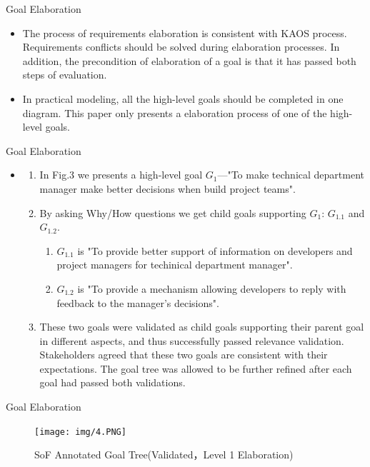 ﻿\documentclass{beamer}
\begin{document}
\begin{frame} {Goal Elaboration}    %
  \small{
    \begin{itemize}
    \item
      The process of requirements elaboration is consistent with KAOS process. Requirements conflicts should be solved during elaboration processes. In addition, the precondition of elaboration of a goal is that it has passed both steps of evaluation. \pause
    \item
      In practical modeling, all the high-level goals should be completed in one diagram. This paper only presents a elaboration process of one of the high-level goals.\pause
    \end{itemize}
  }
\end{frame}
\begin{frame}  {Goal Elaboration}
  \footnotesize{
    \begin{itemize}
    \item
      \begin{enumerate}
      \item  In Fig.3 we presents a high-level goal $G_1$—"To make technical department manager make better decisions when build project teams".
      \item  By asking Why/How questions we get child goals supporting $G_1$: $G_{1.1}$ and $G_{1.2}$.
        \begin{enumerate}
        \item  $G_{1.1}$ is "To provide better support of information on developers and project managers for techinical department manager".
        \item  $G_{1.2}$ is "To provide a mechanism allowing developers to reply with feedback to the manager's decisions".
        \end{enumerate}
      \item  These two goals were validated as child goals supporting their parent goal in different aspects, and thus successfully passed relevance validation. Stakeholders agreed that these two goals are consistent with their expectations. The goal tree was allowed to be further refined after each goal had passed both validations.\pause
      \end{enumerate}
    \end{itemize}
  }
\end{frame}

\begin{frame}  {Goal Elaboration}
  \begin{figure}
    \texttt{[image: img/4.PNG]}
    \caption{SoF Annotated Goal Tree(Validated，Level 1 Elaboration)}
  \end{figure}
\end{frame}
\end{document}

